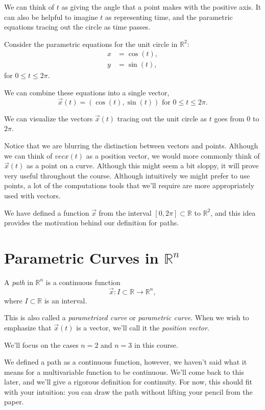 \documentclass{ximera}
\begin{document}
We can think of $t$ as giving the angle that a point makes with the positive axis. It can also be helpful to imagine $t$ as representing time, and the parametric equations tracing out the circle as time passes.


Consider the parametric equations for the unit circle in $\mathbb{R}^2$:
\begin{align*}
x & = \cos(t),\\
y & = \sin(t),
\end{align*}
for $0\leq t \leq 2\pi$.

We can combine these equations into a single vector,
\[
\vec{x}(t) = (\cos(t), \sin(t))\textrm{ for }0\leq t\leq 2\pi.
\]

We can visualize the vectors $\vec{x}(t)$ tracing out the unit circle as $t$ goes from $0$ to $2\pi$.


Notice that we are blurring the distinction between vectors and points. Although we can think of $vec{x}(t)$ as a position vector, we would more commonly think of $\vec{x}(t)$ as a point on a curve. Although this might seem a bit sloppy, it will prove very useful throughout the course. Although intuitively we might prefer to use points, a lot of the computations tools that we'll require are more appropriately used with vectors.

We have defined a function $\vec{x}$ from the interval $[0,2\pi]\subset\mathbb{R}$ to $\mathbb{R}^2$, and this idea provides the motivation behind our definition for paths.

\section*{Parametric Curves in $\mathbb{R}^n$}

\begin{definition}
A \emph{path} in $\mathbb{R}^n$ is a continuous function
\[
\vec{x}:I\subset\mathbb{R}\rightarrow\mathbb{R}^n,
\]
where $I\subset\mathbb{R}$ is an interval.

This is also called a \emph{parametrized curve} or \emph{parametric curve}. When we wish to emphasize that $\vec{x}(t)$ is a vector, we'll call it the \emph{position vector}.
\end{definition}

We'll focus on the cases $n=2$ and $n=3$ in this course.

We defined a path as a continuous function, however, we haven't said what it means for a multivariable function to be continuous. We'll come back to this later, and we'll give a rigorous definition for continuity. For now, this should fit with your intuition: you can draw the path without lifting your pencil from the paper.
\end{document}
